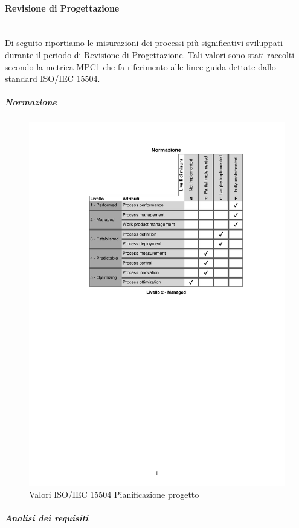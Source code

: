 \paragraph{Revisione di Progettazione}
\noindent \\ 
Di seguito riportiamo le misurazioni dei processi più significativi sviluppati durante il periodo di Revisione di Progettazione. Tali valori sono stati raccolti secondo la metrica MPC1 che fa riferimento alle linee guida dettate dallo standard ISO/IEC 15504.
\subparagraph{Normazione}
\noindent
\begin{figure}[H]
	\centering
	\includegraphics[scale=1]{images/resoconto/RP/normazione-RP.pdf}
	\caption{Valori ISO/IEC 15504 Pianificazione progetto}	
\end{figure}
\newpage
\subparagraph{Analisi dei requisiti}
\noindent
